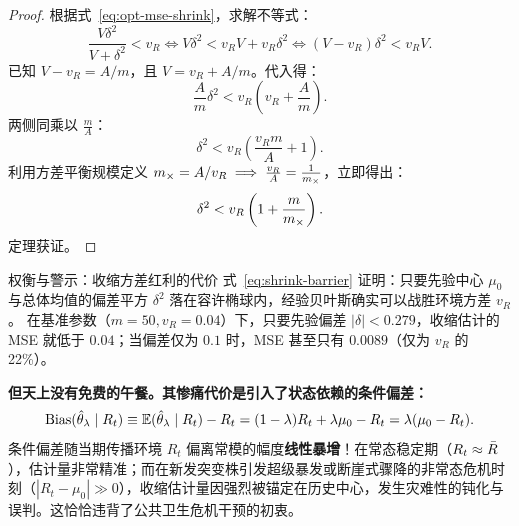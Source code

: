 \begin{proof}
根据式~\eqref{eq:opt-mse-shrink}，求解不等式：
\begin{equation}
  \frac{V \delta^2}{V + \delta^2} < v_R \iff V \delta^2 < v_R V + v_R \delta^2 \iff (V - v_R) \delta^2 < v_R V.
\end{equation}
已知 $V - v_R = A/m$，且 $V = v_R + A/m$。代入得：
\begin{equation}
  \frac{A}{m} \delta^2 < v_R \left( v_R + \frac{A}{m} \right).
\end{equation}
两侧同乘以 $\frac{m}{A}$：
\begin{equation}
  \delta^2 < v_R \left( \frac{v_R m}{A} + 1 \right).
\end{equation}
利用方差平衡规模定义 $m_\times = A / v_R \implies \frac{v_R}{A} = \frac{1}{m_\times}$，立即得出：
\begin{equation}
  \delta^2 < v_R \left( 1 + \frac{m}{m_\times} \right).
\end{equation}
定理获证。
\end{proof}

\begin{insightbox}{权衡与警示：收缩方差红利的代价}
式~\eqref{eq:shrink-barrier} 证明：只要先验中心 $\mu_0$ 与总体均值的偏差平方 $\delta^2$ 落在容许椭球内，经验贝叶斯确实可以战胜环境方差 $v_R$。
在基准参数（$m = 50, v_R = 0.04$）下，只要先验偏差 $|\delta| < 0.279$，收缩估计的 MSE 就低于 $0.04$；当偏差仅为 $0.1$ 时，MSE 甚至只有 $0.0089$（仅为 $v_R$ 的 22\%）。

\textbf{但天上没有免费的午餐。其惨痛代价是引入了状态依赖的条件偏差：}
\begin{equation}
  \text{Bias}(\hat{\theta}_\lambda \mid R_t) \equiv \mathbb{E}(\hat{\theta}_\lambda \mid R_t) - R_t = (1 - \lambda) R_t + \lambda \mu_0 - R_t = \lambda(\mu_0 - R_t).
\end{equation}
条件偏差随当期传播环境 $R_t$ 偏离常模的幅度\textbf{线性暴增}！在常态稳定期（$R_t \approx \bar{R}$），估计量非常精准；而在新发突变株引发超级暴发或断崖式骤降的非常态危机时刻（$|R_t - \mu_0| \gg 0$），收缩估计量因强烈被锚定在历史中心，发生灾难性的钝化与误判。这恰恰违背了公共卫生危机干预的初衷。
\end{insightbox}
